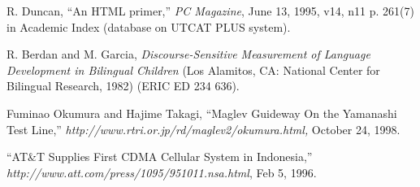 \begin{thebibliography}{1}
R. Duncan, “An HTML primer,” \emph{PC Magazine}, June 13, 1995, v14, n11 p. 261(7) in Academic Index (database on UTCAT PLUS system).

R. Berdan and M. Garcia, \emph{Discourse-Sensitive Measurement of Language Development in Bilingual Children} (Los Alamitos, CA: National Center for
Bilingual Research, 1982) (ERIC ED 234 636).

Fuminao Okumura and Hajime Takagi, “Maglev Guideway On the Yamanashi Test Line,” \emph{http://www.rtri.or.jp/rd/maglev2/okumura.html,} October 24, 1998.

“AT\&T Supplies First CDMA Cellular System in Indonesia,” \emph{http://www.att.com/press/1095/951011.nsa.html}, Feb 5, 1996.

\end{thebibliography}  
